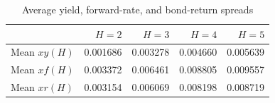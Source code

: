 \begin{table}[htbp]
\centering
\caption{Average yield, forward-rate, and bond-return spreads}
\label{tab:q4a-averages}
\begin{tabular}{lrrrr}
\toprule
 & $H=2$ & $H=3$ & $H=4$ & $H=5$ \\
\midrule
Mean $xy(H)$ & 0.001686 & 0.003278 & 0.004660 & 0.005639 \\
Mean $xf(H)$ & 0.003372 & 0.006461 & 0.008805 & 0.009557 \\
Mean $xr(H)$ & 0.003154 & 0.006069 & 0.008198 & 0.008719 \\
\bottomrule
\end{tabular}
\end{table}

